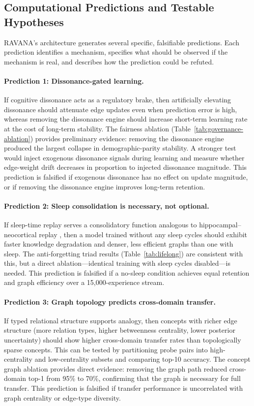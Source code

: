 \documentclass[11pt]{article}
\begin{document}
\subsection{Computational Predictions and Testable Hypotheses}
RAVANA's architecture generates several specific, falsifiable predictions. Each prediction identifies a mechanism, specifies what should be observed if the mechanism is real, and describes how the prediction could be refuted.

\paragraph{Prediction 1: Dissonance-gated learning.}
If cognitive dissonance acts as a regulatory brake, then artificially elevating dissonance should attenuate edge updates even when prediction error is high, whereas removing the dissonance engine should increase short-term learning rate at the cost of long-term stability. The fairness ablation (Table~\ref{tab:governance-ablation}) provides preliminary evidence: removing the dissonance engine produced the largest collapse in demographic-parity stability. A stronger test would inject exogenous dissonance signals during learning and measure whether edge-weight drift decreases in proportion to injected dissonance magnitude. This prediction is falsified if exogenous dissonance has no effect on update magnitude, or if removing the dissonance engine improves long-term retention.

\paragraph{Prediction 2: Sleep consolidation is necessary, not optional.}
If sleep-time replay serves a consolidatory function analogous to hippocampal--neocortical replay \cite{wilson1994,ji2007}, then a model trained without any sleep cycles should exhibit faster knowledge degradation and denser, less efficient graphs than one with sleep. The anti-forgetting triad results (Table~\ref{tab:lifelong}) are consistent with this, but a direct ablation---identical training with sleep cycles disabled---is needed. This prediction is falsified if a no-sleep condition achieves equal retention and graph efficiency over a 15,000-experience stream.

\paragraph{Prediction 3: Graph topology predicts cross-domain transfer.}
If typed relational structure supports analogy, then concepts with richer edge structure (more relation types, higher betweenness centrality, lower posterior uncertainty) should show higher cross-domain transfer rates than topologically sparse concepts. This can be tested by partitioning probe pairs into high-centrality and low-centrality subsets and comparing top-10 accuracy. The concept graph ablation provides direct evidence: removing the graph path reduced cross-domain top-1 from 95\% to 70\%, confirming that the graph is necessary for full transfer. This prediction is falsified if transfer performance is uncorrelated with graph centrality or edge-type diversity.
\end{document}
